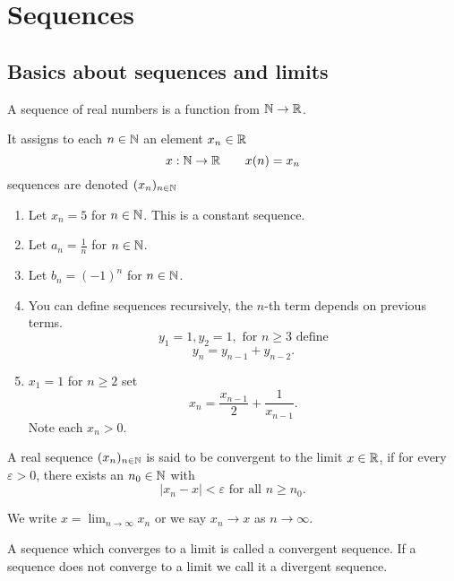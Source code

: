 \documentclass[10pt, a4paper]{article}
\newcommand{\seq}[1][x]{(#1_n)_{n \in \N}}
\begin{document}
\newpage

\section{Sequences}

\subsection{Basics about sequences and limits}
\begin{definition}
    A sequence of real numbers is a function from $\mathbb{N} \rightarrow \mathbb{R}$.
\end{definition}

It assigns to each $n \in \mathbb{N}$ an element $x_n \in \mathbb{R}$
\[
x : \mathbb{N} \rightarrow \mathbb{R}\qquad x(n) = x_n
\]
sequences are denoted $(x_n)_{n \in \mathbb{N}}$

\begin{example}\phantom{}
    \begin{enumerate}[label = (\alph*)]
        \item Let $x_n = 5$ for $n \in \mathbb{N}$. This is a constant sequence.
        \item Let $a_n = \frac{1}{n}$ for $n \in \mathbb{N}$.
        \item Let $b_n = (-1) ^ n$ for $n \in \mathbb{N}$.
        \item You can define sequences recursively, the $n$-th term depends on previous terms.
        \[
        y_1 = 1, y_2 = 1,\text{ for } n \geq 3\text{ define}
        \]
        \[
        y_n = y_{n - 1} + y_{n - 2}.
        \]
        \item $x_1 = 1$ for $n \geq 2$ set
        \[
        x_n = \frac{x_{n - 1}}{2} + \frac{1}{x_{n - 1}}.
        \]
        Note each $x_n > 0$.
    \end{enumerate}
\end{example}

\begin{definition}
    A real sequence $\seq$ is said to be convergent to the limit $x \in \mathbb{R}$, if for every $\varepsilon > 0$, there exists an $n_0 \in \mathbb{N}$ with
    \[
    |x_n - x| < \varepsilon\text{ for all } n \geq n_0.
    \]
\end{definition}
We write $x = \lim_{n \rightarrow \infty} x_n$ or we say $x_n \rightarrow x$ as $n \rightarrow \infty$.

A sequence which converges to a limit is called a convergent sequence.
If a sequence does not converge to a limit we call it a divergent sequence.
\end{document}
